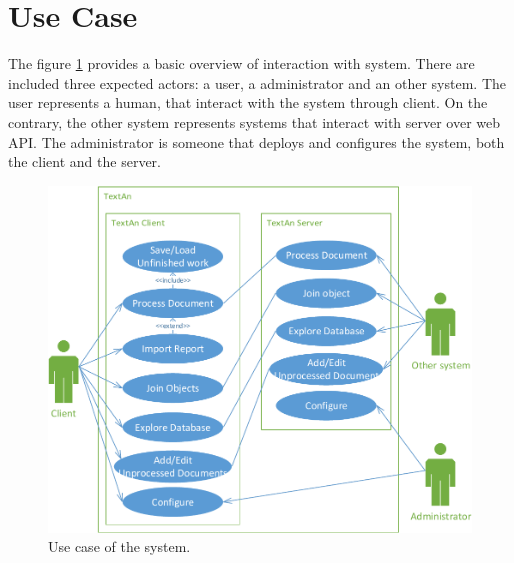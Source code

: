 \section{Use Case}

The figure \ref{fig:UseCase} provides a basic overview of interaction with \textan{}
system. There are included three expected actors: a user, a administrator and
an other system. The user represents a human, that interact with the system through
\textan{} client. On the contrary, the other system represents systems that interact
with \textan{} server over web API. The administrator is someone that deploys and
configures the system, both the client and the server.

\begin{figure}[!htb]
        \centering
        \includegraphics[width=(0.9\textwidth)]{Images/UseCase}
        \caption{Use case of the system.}
        \label{fig:UseCase}
\end{figure}

